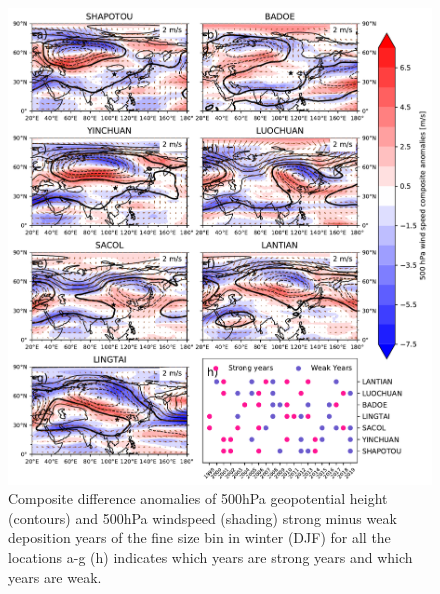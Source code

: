 \begin{figure}[hptb]
    \centering
    \includegraphics[width=\columnwidth]{texfiles/figs/2micrion_DJF_ws_geopot_500hPa.pdf}
    \caption{Composite difference anomalies of 500hPa geopotential height (contours) and 500hPa windspeed (shading) strong minus weak deposition years of the fine size bin in winter (DJF) for all the locations a-g  (h) indicates which years are strong years and which years are weak.}
    \label{fig:DJF_500hPa_fine_composite}
\end{figure}